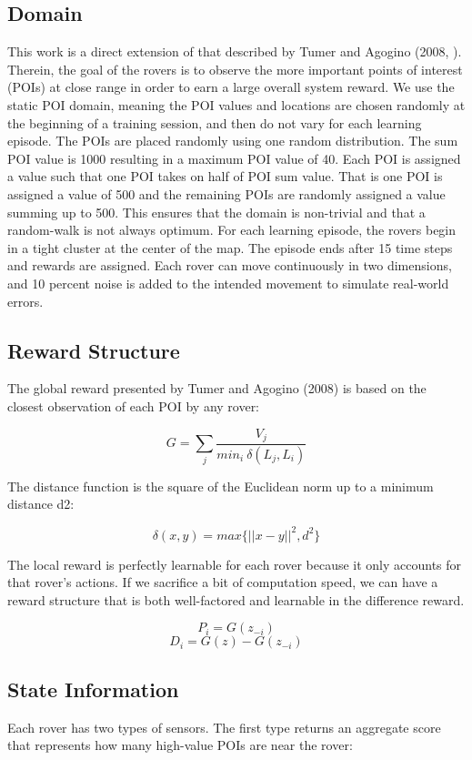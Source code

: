 \documentclass[letterpaper, 10 pt, conference]{ieeeconf}  %
\begin{document}
\subsection{Domain}
This work is a direct extension of that described by Tumer and Agogino
(2008, \cite{agogino2008analyzing}). Therein, the goal of the rovers is to observe the more
important points of interest (POIs) at close range in order to earn a
large overall system reward. We use the static POI domain, meaning the POI values and locations are chosen randomly at the
beginning of a training session, and then do not vary for each learning episode. The POIs are placed randomly using one random distribution. The sum POI value is 1000 resulting in a maximum POI value of 40.  Each POI is assigned a value such that one POI takes on half of POI sum value.  That is one POI is assigned a value of 500 and the remaining POIs are randomly assigned a value summing up to 500.  This ensures that the domain is non-trivial and that a random-walk is not always optimum.  For each learning episode, the rovers begin in a tight cluster at the center of the map. The episode
ends after 15 time steps and rewards are assigned. Each rover can move
continuously in two dimensions, and 10 percent noise is added to the
intended movement to simulate real-world errors.

\subsection{Reward Structure}
The global reward presented by Tumer and Agogino (2008) is based on
the closest observation of each POI by any rover:
  
\[
G= \sum_j  \frac{V_j}{min_i \: \delta(L_j, L_i)}
\]

The distance function is the square of the Euclidean norm up to a
minimum distance d2:

\[
\delta  (x,y) = max \big\{||x - y||^2, d^2 \big\}    
\]

The local reward is perfectly learnable for each rover because it only accounts for that rover's actions. If we sacrifice a bit of computation speed, we can have a reward structure that is both well-factored and learnable in the difference reward.

\[
P_i=G(z_{-i})
\]
\[
D_i=G(z)-G(z_{-i})
\]

\subsection{State Information}
Each rover has two types of sensors. The first type returns an
aggregate score that represents how many high-value POIs are near the
rover:
\end{document}

